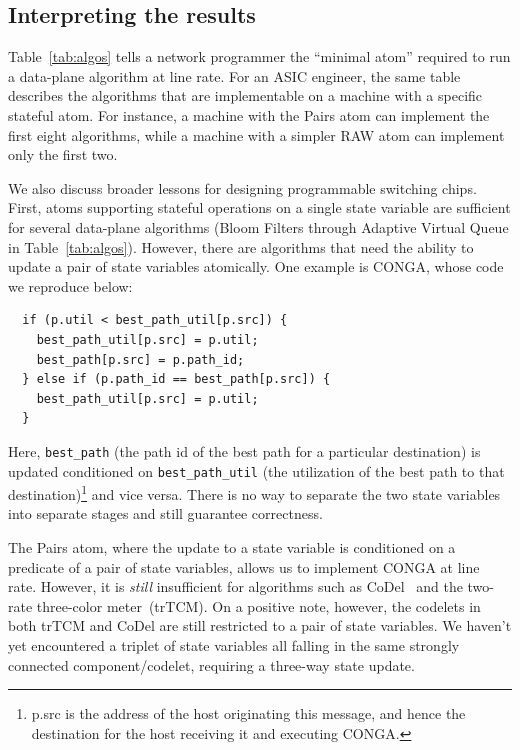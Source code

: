 \subsection{Interpreting the results}
Table~\ref{tab:algos} tells a network programmer the ``minimal atom'' required
to run a data-plane algorithm at line rate. For an ASIC engineer, the same
table describes the algorithms that are implementable on a \absmachine machine
with a specific stateful atom. For instance, a \absmachine machine with the
Pairs atom can implement the first eight algorithms, while a machine with a
simpler RAW atom can implement only the first two.

We also discuss broader lessons for designing programmable switching chips.
First, atoms supporting stateful operations on a single state variable are
sufficient for several data-plane algorithms (Bloom Filters through Adaptive
Virtual Queue in Table~\ref{tab:algos}). However, there are algorithms that
need the ability to update a pair of state variables atomically. One example is
CONGA, whose code we reproduce below:
\begin{verbatim}
  if (p.util < best_path_util[p.src]) {
    best_path_util[p.src] = p.util;
    best_path[p.src] = p.path_id;
  } else if (p.path_id == best_path[p.src]) {
    best_path_util[p.src] = p.util;
  }
\end{verbatim}
Here, \texttt{best\_path} (the path id of the best path for a particular
destination) is updated conditioned on \texttt{best\_path\_util} (the
utilization of the best path to that destination)\footnote{p.src is the address
  of the host originating this message, and hence the destination for the host
receiving it and executing CONGA.} and vice versa. There is no way to separate
the two state variables into separate stages and still guarantee correctness.

The Pairs atom, where the update to a state variable is conditioned on a
predicate of a pair of state variables, allows us to implement CONGA at line
rate.  However, it is \textit{still} insufficient for algorithms such as
CoDel~\cite{codel} and the two-rate three-color meter~\cite{trTCM}(trTCM).  On
a positive note, however, the codelets in both trTCM and CoDel are still
restricted to a pair of state variables.  We haven't yet encountered a triplet
of state variables all falling in the same strongly connected
component/codelet, requiring a three-way state update.

